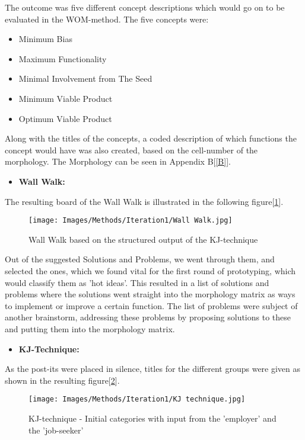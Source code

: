 The outcome was five different concept descriptions which would go on to be evaluated in the WOM-method. The five concepts were:

\begin{itemize}
    \item Minimum Bias
    \item Maximum Functionality
    \item Minimal Involvement from The Seed
    \item Minimum Viable Product
    \item Optimum Viable Product
\end{itemize}

Along with the titles of the concepts, a coded description of which functions the concept would have was also created, based on the cell-number of the morphology. The Morphology can be seen in Appendix B[\ref{B}].

\begin{itemize}
    \item \bf{Wall Walk:}
\end{itemize}

The resulting board of the Wall Walk is illustrated in the following figure[\ref{Wall}]. 

\begin{figure}[H]
\caption{Wall Walk based on the structured output of the KJ-technique}
\centering
\label{Wall}
\texttt{[image: Images/Methods/Iteration1/Wall Walk.jpg]}
\end{figure}

Out of the suggested Solutions and Problems, we went through them, and selected the ones, which we found vital for the first round of prototyping, which would classify them as 'hot ideas'. This resulted in a list of solutions and problems where the solutions went straight into the morphology matrix as ways to implement or improve a certain function. The list of problems were subject of another brainstorm, addressing these problems by proposing solutions to these and putting them into the morphology matrix.

\newpage

\begin{itemize}
    \item \bf{KJ-Technique:}
\end{itemize}

As the post-its were placed in silence, titles for the different groups were given as shown in the resulting figure[\ref{KJ}].

\begin{figure}[H]
\caption{KJ-technique - Initial categories with input from the 'employer' and the 'job-seeker'}
\centering
\label{KJ}
\texttt{[image: Images/Methods/Iteration1/KJ technique.jpg]}
\end{figure}

